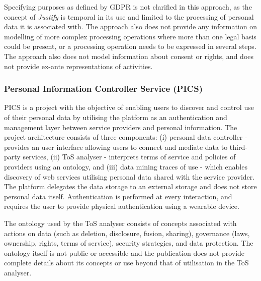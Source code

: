 Specifying purposes as defined by GDPR is not clarified in this approach, as the concept of \textit{Justify} is temporal in its use and limited to the processing of personal data it is associated with. The approach also does not provide any information on modelling of more complex processing operations where more than one legal basis could be present, or a processing operation needs to be expressed in several steps. The approach also does not model information about consent or rights, and does not provide ex-ante representations of activities.

\subsubsection{Personal Information Controller Service (PICS)}
PICS is a project with the objective of enabling users to discover and control use of their personal data by utilising the platform as an authentication and management layer between service providers and personal information. The project architecture \cite{winckler_personal_2019} consists of three components: (i) personal data controller - provides an user interface allowing users to connect and mediate data to third-party services, (ii) ToS analyser - interprets terms of service and policies of providers using an ontology, and (iii) data mining traces of use - which enables discovery of web services utilising personal data shared with the service provider. The platform delegates the data storage to an external storage and does not store personal data itself. Authentication is performed at every interaction, and requires the user to provide physical authentication using a wearable device.

The ontology used by the ToS analyser \cite{benfenatki_towards_2019} consists of concepts associated with actions on data (such as deletion, disclosure, fusion, sharing), governance (laws, ownership, rights, terms of service), security strategies, and data protection. The ontology itself is not public or accessible and the publication does not provide complete details about its concepts or use beyond that of utilisation in the ToS analyser.

